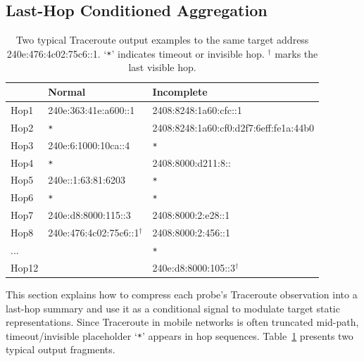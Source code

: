 \documentclass[runningheads]{llncs}
\begin{document}
\subsection{Last-Hop Conditioned Aggregation}

\begin{table}[t]
\caption{Two typical Traceroute output examples to the same target address 240e:476:4c02:75c6::1. `\texttt{*}' indicates timeout or invisible hop. $^\dagger$ marks the last visible hop.}
\label{tab:trace_examples}
\centering
\small
\begin{tabular}{lll}
\toprule
 & Normal & Incomplete \\
\midrule
Hop1 & 240e:363:41e:a600::1 & 2408:8248:1a60:cfc::1 \\
Hop2 & \verb|*| & 2408:8248:1a60:cf0:d2f7:6eff:fe1a:44b0 \\
Hop3 & 240e:6:1000:10ca::4 & \verb|*| \\
Hop4 & \verb|*| & 2408:8000:d211:8:: \\
Hop5 & 240e::1:63:81:6203 & \verb|*| \\
Hop6 & \verb|*| & \verb|*| \\
Hop7 & 240e:d8:8000:115::3 & 2408:8000:2:e28::1 \\
Hop8 & 240e:476:4c02:75c6::1$^\dagger$ & 2408:8000:2:456::1 \\
... & & \verb|*| \\
Hop12 & & 240e:d8:8000:105::3$^\dagger$ \\
\bottomrule
\end{tabular}
\end{table}

This section explains how to compress each probe's Traceroute observation into a last-hop summary and use it as a conditional signal to modulate target static representations. Since Traceroute in mobile networks is often truncated mid-path, timeout/invisible placeholder `\verb|*|' appears in hop sequences. Table~\ref{tab:trace_examples} presents two typical output fragments.
\end{document}
